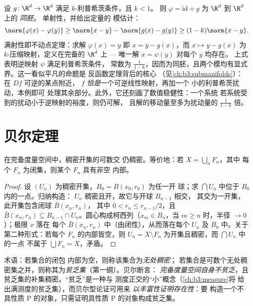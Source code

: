 \begin{example}[恒等映射的扰动]
\label{ex:b3:complete:perturbident}
设 $g \colon \R^d \to \R^d$ 满足 $k$-利普希茨条件，且 $k < 1$。
则 $\varphi = \mathrm{id} + g$ 为 $\R^d$ 到 $\R^d$ 上的 \emph{同胚}。
单射性，并给出定量的
模估计：
\[
\norm{\varphi(x) - \varphi(y)} \geq \norm{x - y} -
\norm{g(x) - g(y)} \geq (1 - k)\norm{x - y} .
\]
满射性即不动点定理：求解
$\varphi(x) = y$ 即 $x = y - g(x)$，而 $x \mapsto y -
g(x)$ 为 $k$-压缩映射，定义在完备的 $\R^d$ 上 ---
唯一解 $x = \psi(y)$ 对每个 $y$ 均存在。
上式表明逆映射 $\psi$ 满足利普希茨条件，
常数为 $\frac1{1-k}$，因而为同胚，且两个模均有显式
界。这一看似平凡的命题是
反函数定理背后的核心
（见\cref{ch:b3:submanifolds}）：在 $Df$ 可逆的某点附近，
$f$ \emph{恰是}一个可逆线性映射，再加一个
小的利普希茨扰动，本例即可
处理其余部分。此外，它还刻画了数值稳健性：一个系统
若系统受到的扰动小于逆映射的裕度，则仍可解，
且解的移动量至多为扰动量的
$\frac{1}{1-k}$ 倍。
\end{example}

\section{贝尔定理}

\begin{theorem}[贝尔]\label{thm:b3:complete:baire}
在完备度量空间中，稠密开集的可数交
仍稠密。等价地：若 $X = \bigcup_{n}F_n$，其中
每个 $F_n$ 为闭集，则某个 $F_n$ 具有非空
内部。
\end{theorem}

\begin{proof}
设 $(U_n)$ 为稠密开集，$B_0 = B(x_0, r_0)$ 为任一开
球；求 $\bigcap U_n$ 中位于 $B_0$ 内的一点。归纳构造：
$U_{n}$ 稠密且开，故它与开球 $B_{n-1}$ 相交，
其交为一开集，此开集包含闭球 $\bar B(x_n, r_n)$，
其中 $0 < r_n \leq r_{n-1}/2$，且 $\bar B(x_n, r_n) \subseteq
B_{n-1}\cap U_n$。圆心构成柯西列（$x_m \in
B_n$，当 $m \geq n$ 时，半径 $\to 0$）；极限 $x$ 落在
每个 $\bar B(x_n, r_n)$ 中（由闭性），从而落在每个 $U_n$ 及
$B_0$ 中。关于第二种形式：若每个 $F_n$ 的内部皆空，则
$U_n = X \setminus F_n$ 为开集且稠密，而 $\bigcap U_n$ 中的一点
不属于 $\bigcup F_n = X$，矛盾。
\end{proof}

\begin{remark}\label{rem:b3:complete:meagre}
术语：若集合的闭包
内部为空，则称该集合为\emph{无处稠密}；
若集合是可数个无处稠密集之并，则称其为\emph{贫乏集}（第一纲）。贝尔断言：
\emph{完备度量空间自身不贫乏}，且
贫乏集的补集稠密。“贫乏”是一种与
测度正交的“小”概念（\cref{ch:b3:measure}将
给出满测度的贫乏集），而贝尔型论证可用来
\emph{以丰富性证明存在性}：要
构造一个不具性质 P 的对象，只需证明具性质 P 的对象构成贫乏集。
\end{remark}

